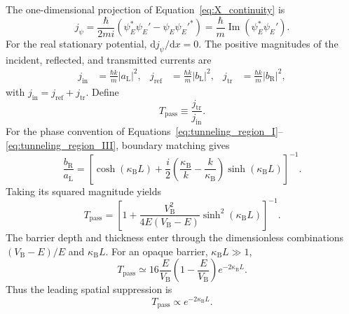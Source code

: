 The one-dimensional projection of Equation~\eqref{eq:X_continuity} is
\begin{equation}
    \boxed{
    j_\psi
    =\frac{\hbar}{2mi}
    \left(\psi_E^*\psi_E'-\psi_E\psi_E'^*\right)
    =\frac{\hbar}{m}\operatorname{Im}(\psi_E^*\psi_E')
    }.
    \label{eq:tunneling_stationary_flux}
\end{equation}
For the real stationary potential, $\mathrm dj_\psi/\mathrm dx=0$. The positive magnitudes of the incident, reflected, and transmitted currents are
\begin{align}
    j_{\mathrm{in}}&=\frac{\hbar k}{m}|a_{\mathrm L}|^2,
    &j_{\mathrm{ref}}&=\frac{\hbar k}{m}|b_{\mathrm L}|^2,
    &j_{\mathrm{tr}}&=\frac{\hbar k}{m}|b_{\mathrm R}|^2,
\end{align}
with $j_{\mathrm{in}}=j_{\mathrm{ref}}+j_{\mathrm{tr}}$. Define
\begin{equation}
    T_{\mathrm{pass}}\equiv\frac{j_{\mathrm{tr}}}{j_{\mathrm{in}}}.
    \label{eq:tunneling_transmission_definition}
\end{equation}
For the phase convention of Equations~\eqref{eq:tunneling_region_I}--\eqref{eq:tunneling_region_III}, boundary matching gives
\begin{equation}
    \frac{b_{\mathrm R}}{a_{\mathrm L}}
    =\left[
        \cosh(\kappa_{\mathrm B}L)
        +\frac{i}{2}
        \left(\frac{\kappa_{\mathrm B}}{k}
        -\frac{k}{\kappa_{\mathrm B}}\right)
        \sinh(\kappa_{\mathrm B}L)
    \right]^{-1}.
\end{equation}
Taking its squared magnitude yields
\begin{equation}
    \boxed{
    T_{\mathrm{pass}}
    =\left[
        1+\frac{V_{\mathrm B}^2}{4E(V_{\mathrm B}-E)}
        \sinh^2(\kappa_{\mathrm B}L)
    \right]^{-1}
    }.
    \label{eq:tunneling_passive_exact}
\end{equation}
The barrier depth and thickness enter through the dimensionless combinations $(V_{\mathrm B}-E)/E$ and $\kappa_{\mathrm B}L$. For an opaque barrier, $\kappa_{\mathrm B}L\gg1$,
\begin{equation}
    \boxed{
    T_{\mathrm{pass}}
    \simeq16\frac{E}{V_{\mathrm B}}
    \left(1-\frac{E}{V_{\mathrm B}}\right)
    e^{-2\kappa_{\mathrm B}L}
    }.
    \label{eq:tunneling_opaque_limit}
\end{equation}
Thus the leading spatial suppression is
\begin{equation}
    T_{\mathrm{pass}}\propto e^{-2\kappa_{\mathrm B}L}.
    \label{eq:tunneling_exponential_scaling}
\end{equation}


